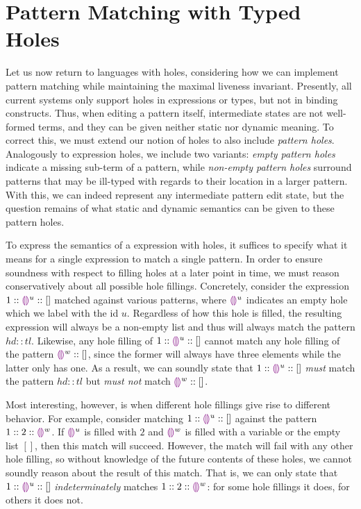 \section{Pattern Matching with Typed Holes}

Let us now return to languages with holes, considering how we can implement pattern matching while maintaining the maximal liveness invariant. Presently, all current systems only support holes in expressions or types, but not in binding constructs. Thus, when editing a pattern itself, intermediate states are not well-formed terms, and they can be given neither static nor dynamic meaning. To correct this, we must extend our notion of holes to also include \emph{pattern holes}. Analogously to expression holes, we include two variants: \emph{empty pattern holes} indicate a missing sub-term of a pattern, while \emph{non-empty pattern holes} surround patterns that may be ill-typed with regards to their location in a larger pattern. With this, we can indeed represent any intermediate pattern edit state, but the question remains of what static and dynamic semantics can be given to these pattern holes.

To express the semantics of a  expression with holes, it suffices to specify what it means for a single expression to match a single pattern. In order to ensure soundness with respect to filling holes at a later point in time, we must reason conservatively about all possible hole fillings. Concretely, consider the expression $1 :: \textcolor{violet}{\llparenthesis}\textcolor{violet}{\rrparenthesis}^{u} :: []$ matched against various patterns, where $\textcolor{violet}{\llparenthesis}\textcolor{violet}{\rrparenthesis}^{u}$ indicates an empty hole which we label with the id $u$. Regardless of how this hole is filled, the resulting expression will always be a non-empty list and thus will always match the pattern $hd :: tl$. Likewise, any hole filling of $1 :: \textcolor{violet}{\llparenthesis}\textcolor{violet}{\rrparenthesis}^{u} :: []$ cannot match any hole filling of the pattern $\textcolor{violet}{\llparenthesis}\textcolor{violet}{\rrparenthesis}^{w} :: []$, since the former will always have three elements while the latter only has one. As a result, we can soundly state that $1 :: \textcolor{violet}{\llparenthesis}\textcolor{violet}{\rrparenthesis}^{u} :: []$ \emph{must} match the pattern $hd :: tl$ but \emph{must not} match $\textcolor{violet}{\llparenthesis}\textcolor{violet}{\rrparenthesis}^{w} :: []$. 

Most interesting, however, is when different hole fillings give rise to different behavior. For example, consider matching $1 :: \textcolor{violet}{\llparenthesis}\textcolor{violet}{\rrparenthesis}^{u} :: []$ against the pattern $1 :: 2 :: \textcolor{violet}{\llparenthesis}\textcolor{violet}{\rrparenthesis}^{w}$. If $\textcolor{violet}{\llparenthesis}\textcolor{violet}{\rrparenthesis}^{u}$ is filled with $2$ and $\textcolor{violet}{\llparenthesis}\textcolor{violet}{\rrparenthesis}^{w}$ is filled with a variable or the empty list $[]$, then this match will succeed. However, the match will fail with any other hole filling, so without knowledge of the future contents of these holes, we cannot soundly reason about the result of this match. That is, we can only state that $1 :: \textcolor{violet}{\llparenthesis}\textcolor{violet}{\rrparenthesis}^{u} :: []$ \emph{indeterminately} matches $1 :: 2 :: \textcolor{violet}{\llparenthesis}\textcolor{violet}{\rrparenthesis}^{w}$: for some hole fillings it does, for others it does not.

